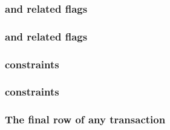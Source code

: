 \subsubsection{\transactionStart{} and related flags}    \label{hub: system: transactions: start}                          
\subsubsection{\transactionEnd{} and related flags}      \label{hub: system: transactions: end}                            
\subsubsection{\transactionNumber{} constraints}         \label{hub: system: transactions: numbers}                        
\subsubsection{\totalTransactionNumber{} constraints}    \label{hub: system: transactions: total transaction number}       
\subsubsection{The final row of any transaction}         \label{hub: system: transactions: final row of any transaction}   
